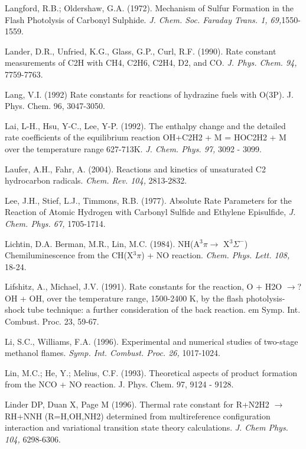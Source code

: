 \documentclass[12pt,landscape]{article}
\newcounter{reaction}
\newcounter{photo}
\begin{document}
Langford, R.B.; Oldershaw, G.A. (1972). Mechanism of Sulfur Formation in the Flash Photolysis of Carbonyl Sulphide. {\em J. Chem. Soc. Faraday Trans. 1, 69,}1550-1559.

Lander, D.R., Unfried, K.G., Glass, G.P., Curl, R.F. (1990). Rate constant measurements of C2H with CH4, C2H6, C2H4, D2, and CO.  {\em J. Phys. Chem. 94,} 7759-7763. 

Lang, V.I. (1992)  Rate constants for reactions of hydrazine fuels with O(3P).  J. Phys. Chem. 96, 3047-3050.

Lai, L-H., Hsu, Y-C., Lee, Y-P. (1992). The enthalpy change and the detailed rate coefficients of the equilibrium reaction OH+C2H2 + M = HOC2H2 + M over the temperature range 627-713K.  {\em J. Chem. Phys. 97,} 3092 - 3099.

Laufer, A.H., Fahr, A. (2004). Reactions and kinetics of unsaturated C2 hydrocarbon radicals. {\em Chem. Rev. 104,} 2813-2832.

Lee, J.H., Stief, L.J., Timmons, R.B. (1977). Absolute Rate Parameters for the Reaction of Atomic Hydrogen with Carbonyl Sulfide and Ethylene Episulfide,  {\em J. Chem. Phys. 67,} 1705-1714.

Lichtin, D.A. Berman, M.R., Lin, M.C. (1984). NH(A$^3\pi \rightarrow$ X$^3\Sigma^-$) Chemiluminescence from the CH(X$^3\pi$) + NO reaction.  {\em Chem. Phys. Lett. 108,} 18-24.

Lifshitz, A., Michael, J.V. (1991). Rate constants for the reaction, O + H2O $\rightarrow$? OH + OH, over the temperature range, 1500-2400 K, by the flash photolysis-shock tube technique: a further consideration of the back reaction. {em Symp. Int. Combust. Proc. 23,}  59-67.

Li, S.C., Williams, F.A. (1996). Experimental and numerical studies of two-stage methanol flames.  {\em Symp. Int. Combust. Proc. 26,} 1017-1024.

Lin, M.C.; He, Y.; Melius, C.F. (1993). Theoretical aspects of product formation from the NCO + NO reaction.  J. Phys. Chem. 97,  9124 - 9128.

Linder DP, Duan X, Page M (1996). Thermal rate constant for R+N2H2 $\rightarrow$ RH+NNH (R=H,OH,NH2) determined from multireference configuration interaction and variational transition state theory calculations. {\em J. Chem Phys. 104,} 6298-6306.
\end{document}
